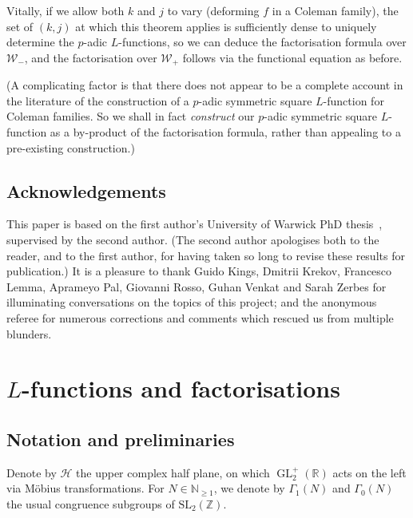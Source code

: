 \documentclass[11pt, a4paper, reqno]{amsart}
\theoremstyle{definition}
\theoremstyle{plain}
\theoremstyle{remark}
\DeclareMathOperator{\GL}{GL}
\newcommand{\numberset}{\mathbb}
\newcommand{\R}{\numberset{R}}
\newcommand{\Z}{\numberset{Z}}
\newcommand{\N}{\numberset{N}}
\newcommand{\HP}{\mathcal{H}}
\newcommand{\Weight}{\mathcal{W}}
\renewcommand{\ge}{\geqslant}
\renewcommand{\geq}{\ge}
\begin{document}
  Vitally, if we allow both $k$ and $j$ to vary (deforming $f$ in a Coleman family), the set of $(k, j)$ at which this theorem applies is sufficiently dense to uniquely determine the $p$-adic $L$-functions, so we can deduce the factorisation formula over $\Weight_-$, and the factorisation over $\Weight_+$ follows via the functional equation as before.

  (A complicating factor is that there does not appear to be a complete account in the literature of the construction of a $p$-adic symmetric square $L$-function for Coleman families. So we shall in fact \emph{construct} our $p$-adic symmetric square $L$-function as a by-product of the factorisation formula, rather than appealing to a pre-existing construction.)

 \subsection*{Acknowledgements}

  This paper is based on the first author's University of Warwick PhD thesis~\cite{arlandini-thesis}, supervised by the second author. (The second author apologises both to the reader, and to the first author, for having taken so long to revise these results for publication.) It is a pleasure to thank Guido Kings, Dmitrii Krekov, Francesco Lemma, Aprameyo Pal, Giovanni Rosso, Guhan Venkat and Sarah Zerbes for illuminating conversations on the topics of this project; and the anonymous referee for numerous corrections and comments which rescued us from multiple blunders.
  

\section{\texorpdfstring{$L$}{L}-functions and factorisations}

 \subsection{Notation and preliminaries}

  Denote by $\HP$ the upper complex half plane, on which $\GL_2^+(\R)$ acts on the left via Möbius transformations. For $N\in\N_{\geq 1}$, we denote by $\Gamma_1(N)$ and $\Gamma_0(N)$ the usual congruence subgroups of $\mathrm{SL}_2(\Z)$.
\end{document}
